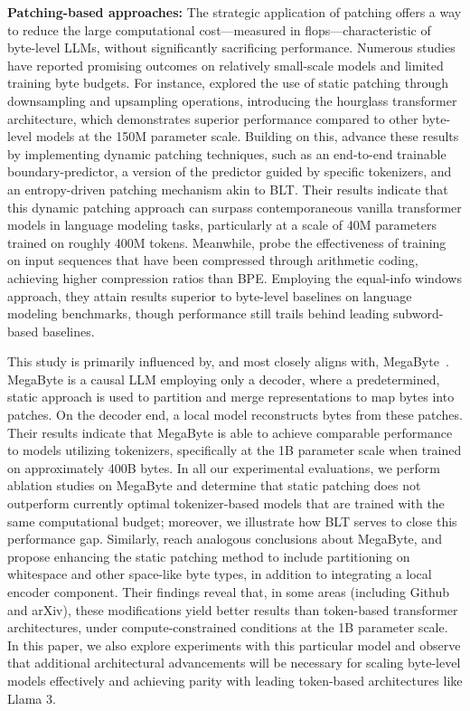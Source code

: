 \textbf{Patching-based approaches:} The strategic application of patching offers a way to reduce the large computational cost—measured in flops—characteristic of byte-level LLMs, without significantly sacrificing performance. Numerous studies have reported promising outcomes on relatively small-scale models and limited training byte budgets. For instance, \cite{nawrot-etal-2022-hierarchical} explored the use of static patching through downsampling and upsampling operations, introducing the hourglass transformer architecture, which demonstrates superior performance compared to other byte-level models at the 150M parameter scale. Building on this, \cite{nawrot-etal-2023-efficient} advance these results by implementing dynamic patching techniques, such as an end-to-end trainable boundary-predictor, a version of the predictor guided by specific tokenizers, and an entropy-driven patching mechanism akin to {\textsc BLT}. Their results indicate that this dynamic patching approach can surpass contemporaneous vanilla transformer models in language modeling tasks, particularly at a scale of 40M parameters trained on roughly 400M tokens. Meanwhile, \cite{lester2024training} probe the effectiveness of training on input sequences that have been compressed through arithmetic coding, achieving higher compression ratios than BPE. Employing the equal-info windows approach, they attain results superior to byte-level baselines on language modeling benchmarks, though performance still trails behind leading subword-based baselines.

This study is primarily influenced by, and most closely aligns with, MegaByte~\citep{yu2023megabyte}. MegaByte is a causal LLM employing only a decoder, where a predetermined, static approach is used to partition and merge representations to map bytes into patches. On the decoder end, a local model reconstructs bytes from these patches. Their results indicate that MegaByte is able to achieve comparable performance to models utilizing tokenizers, specifically at the 1B parameter scale when trained on approximately 400B bytes. In all our experimental evaluations, we perform ablation studies on MegaByte and determine that static patching does not outperform currently optimal tokenizer-based models that are trained with the same computational budget; moreover, we illustrate how {\textsc BLT} serves to close this performance gap. Similarly, \cite{slagle2024spacebyte} reach analogous conclusions about MegaByte, and propose enhancing the static patching method to include partitioning on whitespace and other space-like byte types, in addition to integrating a local encoder component. Their findings reveal that, in some areas (including Github and arXiv), these modifications yield better results than token-based transformer architectures, under compute-constrained conditions at the 1B parameter scale. In this paper, we also explore experiments with this particular model and observe that additional architectural advancements will be necessary for scaling byte-level models effectively and achieving parity with leading token-based architectures like Llama 3.

